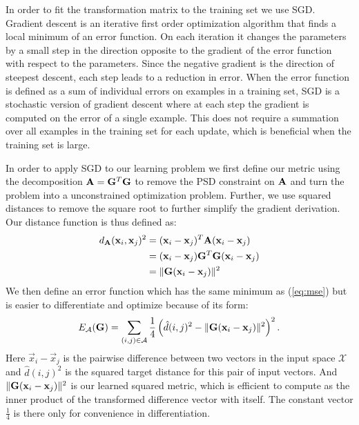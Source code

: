 In order to fit the transformation matrix to the training set we use \acf{SGD}. Gradient descent is an iterative first order optimization algorithm that finds a local minimum of an error function. On each iteration it changes the parameters by a small step in the direction opposite to the gradient of the error function with respect to the parameters. Since the negative gradient is the direction of steepest descent, each step leads to a reduction in error. When the error function is defined as a sum of individual errors on examples in a training set, \ac{SGD} is a stochastic version of gradient descent where at each step the gradient is computed on the error of a single example. This does not require a summation over all examples in the training set for each update, which is beneficial when the training set is large.

In order to apply \ac{SGD} to our learning problem we first define our metric using the decomposition $\mathbf{A} = \mathbf{G}^T\mathbf{G}$ to remove the \ac{PSD} constraint on $\mathbf{A}$ and turn the problem into a unconstrained optimization problem. Further, we use squared distances to remove the square root to further simplify the gradient derivation. Our distance function is thus defined as:
\begin{align}
d_{\mathbf{A}}(\mathbf{x}_i, \mathbf{x}_j)^2 &= (\mathbf{x}_i - \mathbf{x}_j)^T \mathbf{A} (\mathbf{x}_i - \mathbf{x}_j) \\
&= (\mathbf{x}_i - \mathbf{x}_j) \mathbf{G}^T \mathbf{G} (\mathbf{x}_i - \mathbf{x}_j) \\
&= \|\mathbf{G}(\mathbf{x}_i - \mathbf{x}_j)\|^2
\end{align}
We then define an error function which has the same minimum as (\ref{eq:mse}) but is easier to differentiate and optimize because of its form:
\begin{equation}
E_{\mathcal{A}}(\mathbf{G}) =  \sum_{(i,j) \in \mathcal{A}}  \frac{1}{4} \left( \hat{d}(i,j)^2 -  \|\mathbf{G}(\mathbf{x}_i - \mathbf{x}_j)\|^2 \right)^2.
\label{eq:opt_target}
\end{equation}
Here $\vec{x}_i - \vec{x}_j$ is the pairwise difference between two vectors in the input space $\mathcal{X}$ and $\hat{d}(i,j)^2$ is the squared target distance for this pair of input vectors. And $\|\mathbf{G}(\mathbf{x}_i - \mathbf{x}_j)\|^2$ is our learned squared metric, which is efficient to compute as the inner product of the transformed difference vector with itself. The constant vector $\frac{1}{4}$ is there only for convenience in differentiation. 

